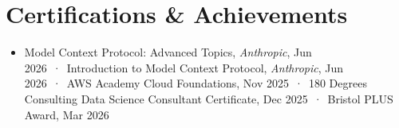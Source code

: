 \documentclass[a4paper,11pt]{article}
\newcommand{\dotsep}{\nobreak\ ·\ }
\newcommand{\sectionhead}[1]{\needspace{5\baselineskip}\section{#1}}
\begin{document}
\sectionhead{Certifications \& Achievements}
\vspace{2pt}

\begin{itemize}
    \item Model Context Protocol: Advanced Topics, \textit{Anthropic}, Jun 2026\dotsep Introduction to Model Context Protocol, \textit{Anthropic}, Jun 2026\dotsep AWS Academy Cloud Foundations, Nov 2025\dotsep 180 Degrees Consulting Data Science Consultant Certificate, Dec 2025\dotsep Bristol PLUS Award, Mar 2026
\end{itemize}
\end{document}
